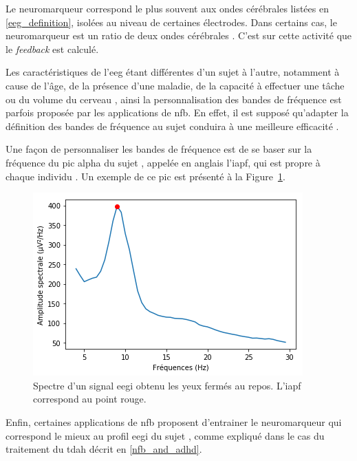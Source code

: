 Le neuromarqueur correspond le plus souvent aux ondes cérébrales listées en \ref{eeg_definition}, isolées au 
niveau de certaines électrodes. Dans certains cas, le neuromarqueur est un ratio de deux ondes cérébrales \citep{Gevensleben2009}. C'est sur cette activité que le \textit{feedback}
est calculé. 

Les caractéristiques de l'\gls{eeg} étant différentes d'un sujet à l'autre, notamment à cause de l'âge, de la présence d'une maladie, de la capacité à effectuer une tâche ou du volume 
du cerveau \citep{Enriquez2017, Klimesch1999, Moretti2004, Alkoby2017}, ainsi la personnalisation des bandes de fréquence est parfois proposée par les applications de \gls{nfb}. 
En effet, il est supposé qu'adapter la définition des bandes de fréquence au sujet conduira à une meilleure efficacité \citep{Enriquez2017}. 

Une façon de personnaliser les bandes de fréquence est de se baser sur la fréquence du pic alpha du sujet 
\citep{Alkoby2017, Escolano2014, Bazanova2018, Bioulac2019}, appelée en anglais l'\gls{iapf}, qui 
est propre à chaque individu \citep{Haegens2014, Aurlien2004, Smit2006}. Un exemple de ce pic est présenté à la Figure~\ref{Figure:introduction_iapf}.

\begin{figure}[h!]
  \centering
	\includegraphics[width=0.7\linewidth]{figures/chapter-1/introduction-iapf} 
  \caption[Spectre d'un signal \gls{eegi} obtenu les yeux fermés au repos.]{Spectre d'un signal \gls{eegi} obtenu les yeux fermés au repos. L'\gls{iapf} correspond au point rouge.}
  \label{Figure:introduction_iapf}
\end{figure}

Enfin, certaines applications de \gls{nfb} proposent d'entrainer le neuromarqueur qui correspond le mieux au profil \gls{eegi} du sujet 
\citep{Bioulac2019, Kerson2013}, comme expliqué dans le cas du traitement du \gls{tdah} décrit en \ref{nfb_and_adhd}. 

